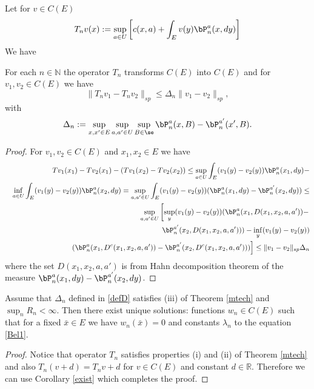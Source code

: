 \documentclass[10pt,english]{extarticle}
\begin{document}
Let for $v\in C(E)$
\begin{equation}\label{opT}
T_nv(x) := \sup_{a\in U} \left[c(x,a)+\int_E v(y)\bP_n^a(x,dy)\right]
\end{equation}
We have
\begin{lemma}
For each $n\in \mathbb{N}$ the operator $T_n$ transforms $C(E)$ into $C(E)$ and for $v_1,v_2\in C(E)$ we have
\begin{equation}
\|T_n v_1 - T_nv_2\|_{sp}\leq \Delta_n \|v_1-v_2\|_{sp},
\end{equation}
with
\begin{equation}\label{defD}
\Delta_n:=\sup_{x,x'\in E} \sup_{a,a'\in U} \sup_{B\in \se} \bP_n^a(x,B)-\bP_n^{a'}(x',B).
\end{equation}
\end{lemma}
\begin{proof}
For $v_1,v_2\in C(E)$ and $x_1,x_2\in E$ we have 
\begin{eqnarray}
&&Tv_1(x_1)-Tv_2(x_1)-(Tv_1(x_2)-Tv_2(x_2))\leq \sup_{a\in U}\int_E (v_1(y)-v_2(y)) \bP_n^a(x_1,dy) - \nonumber \\
&&\inf_{a\in U} \int_E (v_1(y)-v_2(y)) \bP_n^a(x_2,dy)= \sup_{a,a'\in U} \int_E (v_1(y)-v_2(y)) (\bP_n^a(x_1,dy) - \bP_n^{a'}(x_2,dy))\leq  \nonumber \\
&&\sup_{a,a'\in U} \left[\sup_y (v_1(y)-v_2(y))(\bP_n^a(x_1,D(x_1,x_2,a,a')) - \right. \nonumber \\ &&\bP_n^{a'}(x_2,D(x_1,x_2,a,a')))-\inf_y (v_1(y)-v_2(y)) \nonumber \\
&&\left. (\bP_n^a(x_1,D^c(x_1,x_2,a,a')) - \bP_n^{a'}(x_2,D^c(x_1,x_2,a,a')))\right]\leq \|v_1-v_2\|_{sp} \Delta_n  
\end{eqnarray}
where the set $D(x_1,x_2,a,a')$ is from Hahn decomposition theorem of the measure $\bP_n^a(x_1,dy) - \bP_n^{a'}(x_2,dy)$. 
\end{proof}
\begin{theorem}\label{averp}
Assume that $\Delta_n$ defined in \eqref{defD} satisfies (iii) of Theorem \ref{mtech} and $\sup_n R_n<\infty$. Then there exist unique solutions: functions  $w_n\in C(E)$ such that for a fixed $\bar{x}\in E$ we have  $w_n(\bar{x})=0$ and constants $\lambda_n$  to the equation \eqref{Bel1}.
\end{theorem}
\begin{proof}
Notice that operator $T_n$ satisfies properties (i) and (ii) of Theorem \ref{mtech} and also $T_n(v+d)=T_nv+d$ for $v\in C(E)$ and constant $d\in \mathbb{R}$. Therefore we can use Corollary \ref{exist} which completes the proof.
\end{proof}
\end{document}
